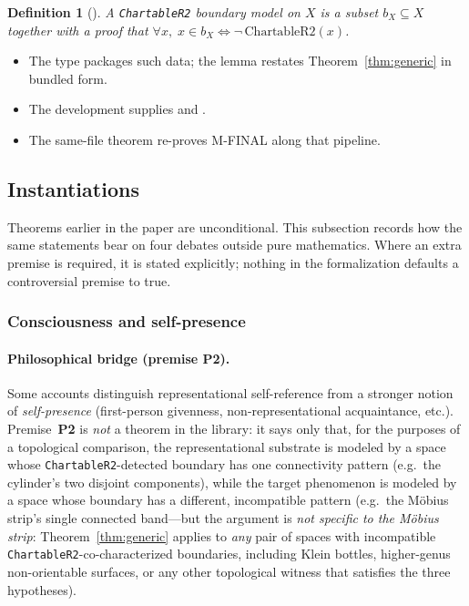 \documentclass[11pt]{article}
\newtheorem{definition}[theorem]{Definition}
\begin{document}
\begin{definition}[]
A \emph{\texttt{ChartableR2} boundary model} on $X$ is a subset $b_X \subseteq X$
together with a proof that
$\forall x,\; x \in b_X \iff \neg\,\mathrm{ChartableR2}(x)$.
\end{definition}

\noindent
\begin{itemize}[leftmargin=1.75em,itemsep=0.35ex,topsep=0.6ex,parsep=0pt]
\item The type  packages such data; the lemma
   restates
  Theorem~\ref{thm:generic} in bundled form.
\item The development  supplies\newline
   and
  .
\item The same-file theorem\newline
  \newline
  re-proves M-FINAL along that pipeline.
\end{itemize}

\subsection{Instantiations}
\label{sec:instantiations}

Theorems earlier in the paper are unconditional. This subsection records how the
same statements bear on four debates outside pure mathematics. Where an extra
premise is required, it is stated explicitly; nothing in the formalization
defaults a controversial premise to true.

\subsubsection{Consciousness and self-presence}

\paragraph{Philosophical bridge (premise P2).}
Some accounts distinguish representational self-reference from a stronger notion
of \emph{self-presence} (first-person givenness, non-representational
acquaintance, etc.). Premise~\textbf{P2} is \emph{not} a theorem in the library:
it says only that, for the purposes of a topological comparison, the
representational substrate is modeled by a space whose
\texttt{ChartableR2}-detected boundary has one connectivity pattern (e.g.\
the cylinder's two disjoint components), while the target phenomenon is modeled
by a space whose boundary has a different, incompatible pattern (e.g.\ the
M\"obius strip's single connected band---but the argument is
\emph{not specific to the M\"obius strip}: Theorem~\ref{thm:generic} applies
to \emph{any} pair of spaces with incompatible
\texttt{ChartableR2}-co-characterized boundaries, including Klein bottles,
higher-genus non-orientable surfaces, or any other topological witness that
satisfies the three hypotheses).
\end{document}
